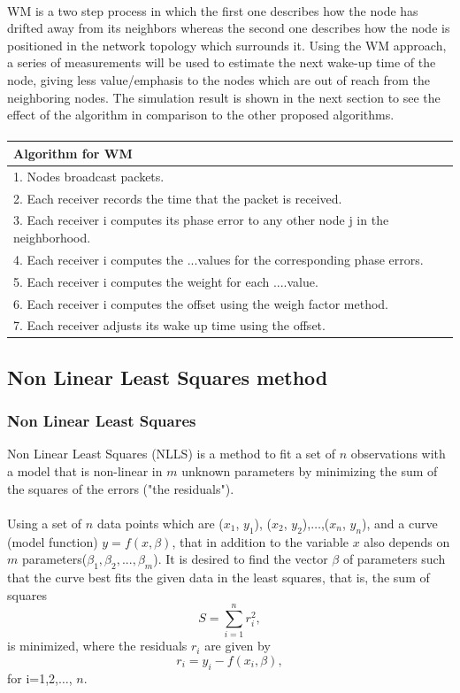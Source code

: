 \documentclass[a4paper,10pt]{report}
\begin{document}
\paragraph*{}
WM is a two step process in which the first one describes how the node has drifted away from its neighbors
whereas the second one describes how the node is positioned in the network topology which surrounds it. Using the WM approach, a series of measurements will be used to estimate the next wake-up time of the node, giving less value/emphasis to the nodes which are out of reach from the neighboring nodes. The simulation result is shown in the next section to see the effect of the algorithm in comparison to the other proposed algorithms.\paragraph*{}
\begin{tabular}{  l }Algorithm for WM \\\hline \hline
1. Nodes broadcast packets. \\  2. Each receiver records the time that the packet is received. \\
3. Each receiver i computes its phase error to any other node j in the neighborhood. \\
4. Each receiver i computes the ...values for the corresponding phase errors. \\
5. Each receiver i computes the weight for each ....value. \\
6. Each receiver i computes the offset using the weigh factor method. \\
7. Each receiver adjusts its wake up time using the offset.\\
\hline \hline
\end{tabular}
\subsection{\textbf{Non Linear Least Squares method}}
\subsubsection{Non Linear Least Squares}
Non Linear Least Squares (NLLS) is a method to fit a set of $n$ observations with a model that is non-linear in $m$ unknown parameters by minimizing the sum of the squares of the errors ("the residuals").
\paragraph*{}
Using a set of $n$ data points which are ($x_1$, $y_1$), ($x_2$, $y_2$),$\dots$,($x_n$, $y_n$), and a curve (model function) $y= f(x, \beta)$, that in addition to the variable $x$ also depends on $m$ parameters($\beta_1,\beta_2,...,\beta_m$).
It is desired to find the vector $\beta$ of parameters such that the curve best fits the given data in the least squares, that is, the sum of squares
\begin{equation}
    S=\sum_{i=1}^{n}r_i^2 ,
\end{equation}
is minimized, where the residuals $r_i$ are given by
\begin{equation}
    r_i = y_i - f(x_i,\beta),
\end{equation}
for i=1,2,$\dots$, $n$.
\end{document}
